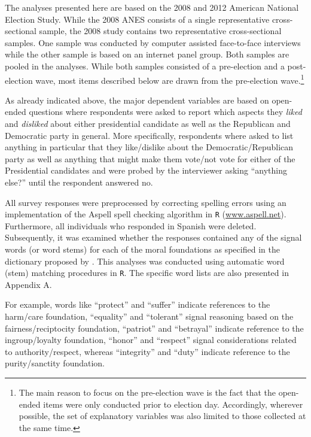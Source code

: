 \documentclass[12pt]{article}
\begin{document}
The analyses presented here are based on the 2008 and 2012 American National Election Study. While the 2008 ANES consists of a single representative cross-sectional sample, the 2008 study contains two representative cross-sectional samples. One sample was conducted by computer assisted face-to-face interviews while the other sample is based on an internet panel group. Both samples are pooled in the analyses. While both samples consisted of a pre-election and a post-election wave, most items described below are drawn from the pre-election wave.\footnote{The main reason to focus on the pre-election wave is the fact that the open-ended items were only conducted prior to election day. Accordingly, wherever possible, the set of explanatory variables was also limited to those collected at the same time.}

As already indicated above, the major dependent variables are based on open-ended questions where respondents were asked to report which aspects they \textit{liked} and \textit{disliked} about either presidential candidate as well as the Republican and Democratic party in general. More specifically, respondents where asked to list anything in particular that they like/dislike about the Democratic/Republican party as well as anything that might make them vote/not vote for either of the Presidential candidates and were probed by the interviewer asking ``anything else?'' until the respondent answered no.

All survey responses were preprocessed by correcting spelling errors using an implementation of the Aspell spell checking algorithm in \texttt{R} (\url{www.aspell.net}). Furthermore, all individuals who responded in Spanish were deleted. Subsequently, it was examined whether the responses contained any of the signal words (or word stems) for each of the moral foundations as specified in the dictionary proposed by \citet{graham2009liberals}. This analyses was conducted using automatic word (stem) matching procedures in \texttt{R}. The specific word lists are also presented in Appendix A. 

For example, words like ``protect'' and ``suffer'' indicate references to the harm/care foundation, ``equality'' and ``tolerant'' signal reasoning based on the fairness/reciptocity foundation, ``patriot'' and ``betrayal'' indicate reference to the ingroup/loyalty foundation, ``honor'' and ``respect'' signal considerations related to authority/respect, whereas ``integrity'' and ``duty'' indicate reference to the purity/sanctity foundation.
\end{document}
